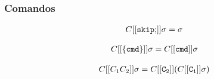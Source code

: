 \documentclass[12pt]{article}
\newcommand\eb[1]{[[\texttt{#1}]]}
\begin{document}

\subsubsection{Comandos}

\begin{align*}
C[[{\tt skip;}]] \sigma = \sigma
\end{align*}

\begin{align*}
C[[{\tt \{cmd\}}]] \sigma = C[[{\tt cmd}]] \sigma \\
\end{align*}

\begin{align*}
C[[{C_1 C_2}]] \sigma = C[[{\tt C_2}]] ( C[[{\tt C_1}]] \sigma)
\end{align*}
\end{document}
